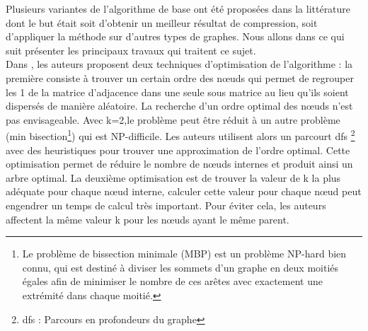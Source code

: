 Plusieurs variantes de l'algorithme de base ont été proposées dans la littérature dont le but était soit d'obtenir un meilleur résultat de compression, soit d'appliquer la méthode sur d'autres types de graphes. Nous allons dans ce qui suit présenter les principaux travaux qui traitent ce sujet.\\

Dans \citep{shi2012optimizing}, les auteurs proposent deux techniques d'optimisation de l'algorithme : la première consiste à trouver un certain ordre des nœuds qui permet de regrouper les 1 de la matrice d'adjacence dans une seule sous matrice au lieu qu'ils soient dispersés de manière aléatoire. La recherche d'un ordre optimal des nœuds n'est pas envisageable. Avec k=2,le problème peut être réduit à un autre problème (min bisection\footnote{Le problème de bissection minimale (MBP) est un problème NP-hard bien connu, qui est destiné à diviser les sommets d'un graphe en deux moitiés égales afin de minimiser le nombre de ces arêtes avec exactement une extrémité dans chaque moitié.}) qui est NP-difficile. Les auteurs utilisent alors un parcourt \gls{dfs}
\footnote{\gls{dfs} : Parcours en profondeurs du graphe}
 avec des heuristiques pour trouver une approximation de l'ordre optimal. Cette optimisation permet de réduire le nombre de nœuds internes et produit ainsi un arbre optimal. La deuxième optimisation est de trouver la valeur de k la plus adéquate pour chaque nœud interne, calculer cette valeur pour chaque nœud peut engendrer un temps de calcul très important. Pour éviter cela, les auteurs affectent la même valeur k pour les nœuds ayant le même parent. 	

